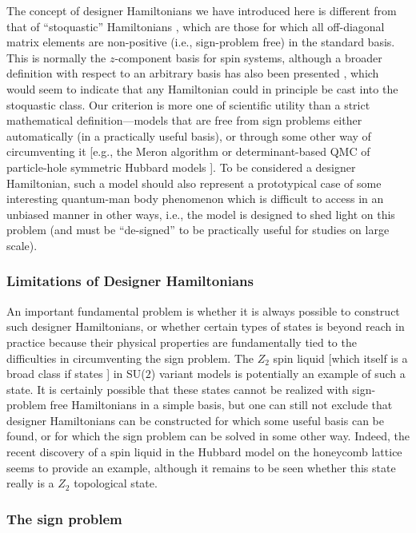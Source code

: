 \documentclass[10pt,pre,aps,twocolumn,showpacs,subscriptaddresses,floatfix]{revtex4}
\begin{document}
The concept of designer Hamiltonians we have introduced here is different from that of ``stoquastic'' Hamiltonians \cite{Terhal08}, which are
those for which all off-diagonal matrix elements are non-positive (i.e., sign-problem free) in the standard basis.  This is normally the  $z$-component 
basis for spin systems, although a broader definition with respect to an arbitrary basis has also been presented \cite{Terhal09}, which would seem to 
indicate that any Hamiltonian could in principle be cast into the stoquastic class. Our criterion is more one of scientific utility than a strict mathematical 
definition---models that are free from sign problems either automatically (in a practically useful basis), or through some 
other way of circumventing it [e.g., the Meron algorithm \cite{Chandrasekharan99} or determinant-based QMC of particle-hole symmetric Hubbard 
models \cite{White89,Assaad05,Assaad07}]. To be considered a designer Hamiltonian, such a model should also represent a prototypical case of 
some interesting quantum-man body phenomenon which is difficult to access in an unbiased manner in other ways, i.e., the model is designed to shed
light on this problem (and must be ``de-signed'' to be practically useful for studies on large scale).

\subsubsection{Limitations of Designer Hamiltonians}

An important fundamental problem is whether it is always possible to construct such designer Hamiltonians, or whether certain types of 
states is beyond reach in practice because their physical properties are fundamentally tied to the difficulties in circumventing the sign problem. 
The $Z_2$ spin liquid [which itself is a broad class if states \cite{Wen03}] in SU($2$) variant models is potentially an example of such a state. 
It is certainly possible that these states cannot be realized with sign-problem free Hamiltonians in a simple basis, but one can still not exclude that 
designer Hamiltonians can be constructed for which some useful basis can be found, or for which the sign problem can be solved in some other way.
Indeed, the recent discovery of a spin liquid in the Hubbard model on the honeycomb lattice \cite{Meng10} seems to provide an example, although it 
remains to be seen whether this state really is a $Z_2$ topological state.

\subsubsection{The sign problem}
\end{document}
